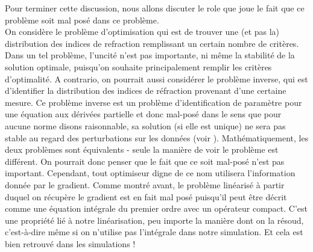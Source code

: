 \documentclass{article}
\begin{document}
Pour terminer cette discussion, nous allons discuter le role que joue le fait que ce problème soit mal posé dans ce problème.\\
On considère le problème d'optimisation qui est de trouver une (et pas la) distribution des indices de refraction remplissant un certain nombre de critères. Dans un tel problème, l'uncité n'est pas importante, ni même la stabilité de la solution optimale, puisqu'on souhaite principalement remplir les critères d'optimalité. A contrario, on pourrait aussi considérer le problème inverse, qui est d'identifier la distribution des indices de réfraction provenant d'une certaine mesure. Ce problème inverse est un problème d'identification de paramètre pour une équation aux dérivées partielle et donc mal-posé dans le sens que pour aucune norme disons raisonnable, sa solution (si elle est unique) ne sera pas stable au regard des perturbations sur les données (voir \cite{engl96regu}). Mathématiquement, les deux problèmes sont équivalents - seule la manière de voir le problème est différent. 
On pourrait donc penser que le fait que ce soit mal-posé n'est pas important. Cependant, tout optimiseur digne de ce nom utilisera l'information donnée par le gradient. Comme montré avant, le problème linéarisé à partir duquel on récupère le gradient est en fait mal posé puisqu'il peut être décrit comme une équation intégrale du premier ordre avec un opérateur compact. 
C'est une propriété lié à notre linéarisation, peu importe la manière dont on la résoud, c'est-à-dire même si on n'utilise pas l'intégrale dans notre simulation. Et cela est bien retrouvé dans les simulations !\\
\end{document}
